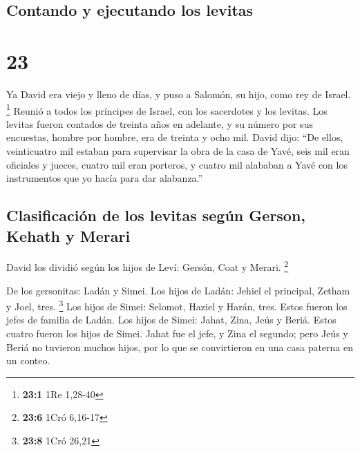 \hypertarget{contando-y-ejecutando-los-levitas}{%
\subsection{Contando y ejecutando los
levitas}\label{contando-y-ejecutando-los-levitas}}

\hypertarget{section-22}{%
\section{23}\label{section-22}}

 Ya David era viejo y lleno de días, y puso a Salomón, su
hijo, como rey de Israel. \footnote{\textbf{23:1} 1Re 1,28-40}
 Reunió a todos los príncipes de Israel, con los
sacerdotes y los levitas.  Los levitas fueron contados de
treinta años en adelante, y su número por sus encuestas, hombre por
hombre, era de treinta y ocho mil.  David dijo: ``De
ellos, veinticuatro mil estaban para supervisar la obra de la casa de
Yavé, seis mil eran oficiales y jueces,  cuatro mil eran
porteros, y cuatro mil alababan a Yavé con los instrumentos que yo hacía
para dar alabanza.''

\hypertarget{clasificaciuxf3n-de-los-levitas-seguxfan-gerson-kehath-y-merari}{%
\subsection{Clasificación de los levitas según Gerson, Kehath y
Merari}\label{clasificaciuxf3n-de-los-levitas-seguxfan-gerson-kehath-y-merari}}

 David los dividió según los hijos de Leví: Gersón, Coat y
Merari. \footnote{\textbf{23:6} 1Cró 6,16-17}

 De los gersonitas: Ladán y Simei.  Los
hijos de Ladán: Jehiel el principal, Zetham y Joel, tres. \footnote{\textbf{23:8}
  1Cró 26,21}  Los hijos de Simei: Selomot, Haziel y
Harán, tres. Estos fueron los jefes de familia de Ladán. 
Los hijos de Simei: Jahat, Zina, Jeús y Beriá. Estos cuatro fueron los
hijos de Simei.  Jahat fue el jefe, y Zina el segundo;
pero Jeús y Beriá no tuvieron muchos hijos, por lo que se convirtieron
en una casa paterna en un conteo.

